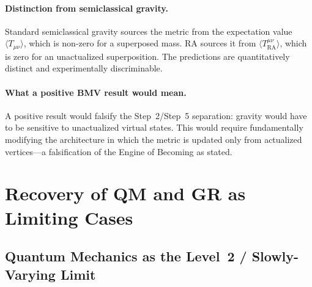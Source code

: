 \documentclass[11pt,a4paper]{article}
\theoremstyle{plain}
\theoremstyle{definition}
\theoremstyle{remark}
\newcommand{\Tact}{T^{\mu\nu}_{\mathrm{RA}}}
\begin{document}
\paragraph{Distinction from semiclassical gravity.}
Standard semiclassical gravity sources the metric from the expectation value
$\langle T_{\mu\nu}\rangle$, which is non-zero for a superposed mass. RA
sources it from $\langle\Tact\rangle$, which is zero for an unactualized
superposition. The predictions are quantitatively distinct and experimentally
discriminable.

\paragraph{What a positive BMV result would mean.}
A positive result would falsify the Step~2/Step~5 separation: gravity would
have to be sensitive to unactualized virtual states. This would require
fundamentally modifying the architecture in which the metric is updated only
from actualized vertices---a falsification of the Engine of Becoming as stated.

\section{Recovery of QM and GR as Limiting Cases}
\label{sec:limits}

\subsection{Quantum Mechanics as the Level~2 / Slowly-Varying Limit}
\end{document}
